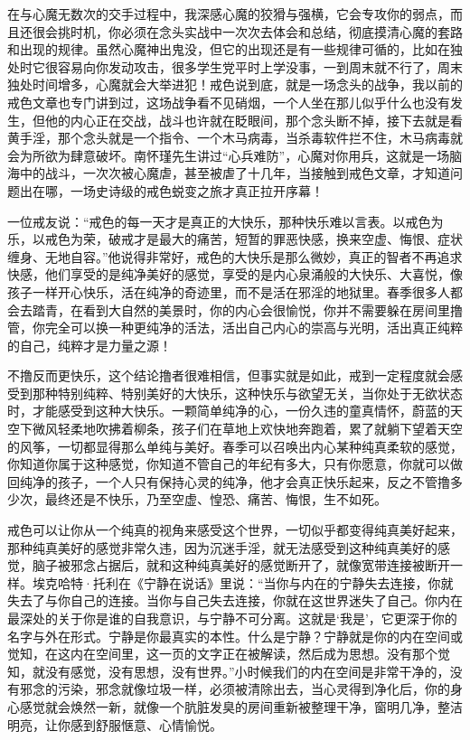 在与心魔无数次的交手过程中，我深感心魔的狡猾与强横，它会专攻你的弱点，而且还很会挑时机，你必须在念头实战中一次次去体会和总结，彻底摸清心魔的套路和出现的规律。虽然心魔神出鬼没，但它的出现还是有一些规律可循的，比如在独处时它很容易向你发动攻击，很多学生党平时上学没事，一到周末就不行了，周末独处时间增多，心魔就会大举进犯！戒色说到底，就是一场念头的战争，我以前的戒色文章也专门讲到过，这场战争看不见硝烟，一个人坐在那儿似乎什么也没有发生，但他的内心正在交战，战斗也许就在眨眼间，那个念头断不掉，接下去就是看黄手淫，那个念头就是一个指令、一个木马病毒，当杀毒软件拦不住，木马病毒就会为所欲为肆意破坏。南怀瑾先生讲过“心兵难防”，心魔对你用兵，这就是一场脑海中的战斗，一次次被心魔虐，甚至被虐了十几年，当接触到戒色文章，才知道问题出在哪，一场史诗级的戒色蜕变之旅才真正拉开序幕！

一位戒友说：“戒色的每一天才是真正的大快乐，那种快乐难以言表。以戒色为乐，以戒色为荣，破戒才是最大的痛苦，短暂的罪恶快感，换来空虚、悔恨、症状缠身、无地自容。”他说得非常好，戒色的大快乐是那么微妙，真正的智者不再追求快感，他们享受的是纯净美好的感觉，享受的是内心泉涌般的大快乐、大喜悦，像孩子一样开心快乐，活在纯净的奇迹里，而不是活在邪淫的地狱里。春季很多人都会去踏青，在看到大自然的美景时，你的内心会很愉悦，你并不需要躲在房间里撸管，你完全可以换一种更纯净的活法，活出自己内心的崇高与光明，活出真正纯粹的自己，纯粹才是力量之源！

不撸反而更快乐，这个结论撸者很难相信，但事实就是如此，戒到一定程度就会感受到那种特别纯粹、特别美好的大快乐，这种快乐与欲望无关，当你处于无欲状态时，才能感受到这种大快乐。一颗简单纯净的心，一份久违的童真情怀，蔚蓝的天空下微风轻柔地吹拂着柳条，孩子们在草地上欢快地奔跑着，累了就躺下望着天空的风筝，一切都显得那么单纯与美好。春季可以召唤出内心某种纯真柔软的感觉，你知道你属于这种感觉，你知道不管自己的年纪有多大，只有你愿意，你就可以做回纯净的孩子，一个人只有保持心灵的纯净，他才会真正快乐起来，反之不管撸多少次，最终还是不快乐，乃至空虚、惶恐、痛苦、悔恨，生不如死。

戒色可以让你从一个纯真的视角来感受这个世界，一切似乎都变得纯真美好起来，那种纯真美好的感觉非常久违，因为沉迷手淫，就无法感受到这种纯真美好的感觉，脑子被邪念占据后，就和这种纯真美好的感觉断开了，就像宽带连接被断开一样。埃克哈特·托利在《宁静在说话》里说：“当你与内在的宁静失去连接，你就失去了与你自己的连接。当你与自己失去连接，你就在这世界迷失了自己。你内在最深处的关于你是谁的自我意识，与宁静不可分离。这就是‘我是’，它更深于你的名字与外在形式。宁静是你最真实的本性。什么是宁静？宁静就是你的内在空间或觉知，在这内在空间里，这一页的文字正在被解读，然后成为思想。没有那个觉知，就没有感觉，没有思想，没有世界。”小时候我们的内在空间是非常干净的，没有邪念的污染，邪念就像垃圾一样，必须被清除出去，当心灵得到净化后，你的身心感觉就会焕然一新，就像一个肮脏发臭的房间重新被整理干净，窗明几净，整洁明亮，让你感到舒服惬意、心情愉悦。

